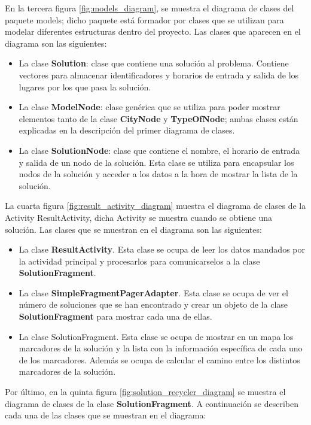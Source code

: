 \vspace{0.06in}
En la tercera figura \ref{fig:models_diagram}, se muestra el diagrama de clases del paquete models; dicho paquete está formador por clases que se utilizan para modelar diferentes estructuras dentro del proyecto. Las clases que aparecen en el diagrama son las siguientes:
\begin{itemize}
	\item La clase \textbf{Solution}: clase que contiene una solución al problema. Contiene vectores para almacenar identificadores y horarios de entrada y salida de los lugares por los que pasa la solución.
	\item La clase \textbf{ModelNode}: clase genérica que se utiliza para poder mostrar elementos tanto de la clase \textbf{CityNode} y \textbf{TypeOfNode}; ambas clases están explicadas en la descripción del primer diagrama de clases.
	\item La clase \textbf{SolutionNode}: clase que contiene el nombre, el horario de entrada y salida de un nodo de la solución. Esta clase se utiliza para encapsular los nodos de la solución y acceder a los datos a la hora de mostrar la lista de la solución.
\end{itemize}
\vspace{0.06in}
La cuarta figura \ref{fig:result_activity_diagram} muestra el diagrama de clases de la Activity ResultActivity, dicha Activity se muestra cuando se obtiene una solución. Las clases que se muestran en el diagrama son las siguientes:
\begin{itemize}
	\item La clase \textbf{ResultActivity}. Esta clase se ocupa de leer los datos mandados por la actividad principal y procesarlos para comunicarselos a la clase \textbf{SolutionFragment}.
	\item La clase \textbf{SimpleFragmentPagerAdapter}. Esta clase se ocupa de ver el número de soluciones que se han encontrado y crear un objeto de la clase \textbf{SolutionFragment} para mostrar cada una de ellas.
	\item La clase SolutionFragment. Esta clase se ocupa de mostrar en un mapa los marcadores de la solución y la lista con la información específica de cada uno de los marcadores. Además se ocupa de calcular el camino entre los distintos marcadores de la solución.
\end{itemize}
\vspace{0.06in}
Por último, en la quinta figura \ref{fig:solution_recycler_diagram} se muestra el diagrama de clases de la clase \textbf{SolutionFragment}. A continuación se describen cada una de las clases que se muestran en el diagrama:
